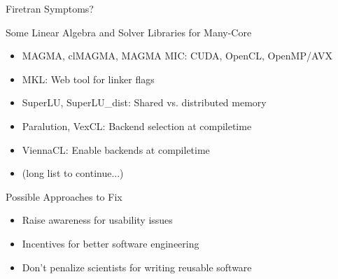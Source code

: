 


\begin{frame}[fragile]{Firetran Symptoms?}

\begin{block}{Some Linear Algebra and Solver Libraries for Many-Core}
 \begin{itemize}
  \item MAGMA, clMAGMA, MAGMA MIC: CUDA, OpenCL, OpenMP/AVX
  \item MKL: Web tool for linker flags
  \item SuperLU, SuperLU\_dist: Shared vs. distributed memory
  \item Paralution, VexCL: Backend selection at compiletime
  \item ViennaCL: Enable backends at compiletime
  \item (long list to continue...)
 \end{itemize}
\end{block}

\begin{block}{Possible Approaches to Fix}
 \begin{itemize}
  \item Raise awareness for usability issues
  \item Incentives for better software engineering
  \item Don't penalize scientists for writing reusable software
 \end{itemize}
\end{block}

\end{frame}
